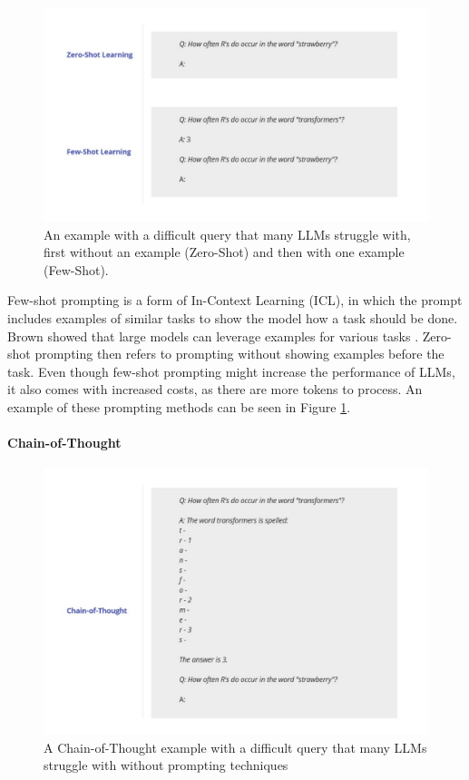 \begin{figure}[h!]
    \centering
    \includegraphics[width=\textwidth]{images/FewShot vs ZeroSHot.pdf}
    \caption{An example with a difficult query that many LLMs struggle with, first without an example (Zero-Shot) and then with one example (Few-Shot).}
    \label{fig:FewZeroShot}
\end{figure}


Few-shot prompting is a form of In-Context Learning (ICL), in which the prompt includes examples of similar tasks to show the model how a task should be done. Brown showed that large models can leverage examples for various tasks \cite{Brown.28.05.2020}. Zero-shot prompting then refers to prompting without showing examples before the task. Even though few-shot prompting might increase the performance of LLMs, it also comes with increased costs, as there are more tokens to process. An example of these prompting methods can be seen in Figure \ref{fig:FewZeroShot}.

\paragraph{Chain-of-Thought}

\begin{figure}[h!]
    \centering
    \includegraphics[width=\textwidth]{images/Chain-of-Thought.pdf}
    \caption{A Chain-of-Thought example with a difficult query that many LLMs struggle with without prompting techniques}
    \label{fig:CoT}
\end{figure}


